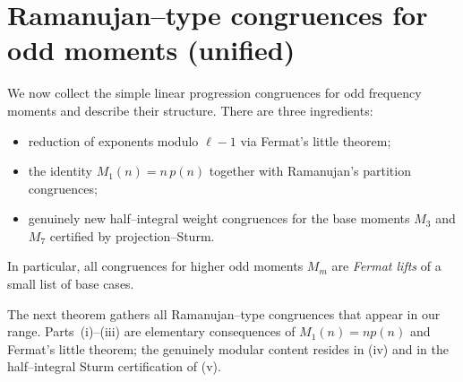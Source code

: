 \documentclass[11pt]{article}
\theoremstyle{definition}
\theoremstyle{remark}
\begin{document}
\section{Ramanujan--type congruences for odd moments (unified)}\label{sec:ram-unified}

We now collect the simple linear progression congruences for odd frequency
moments and describe their structure.  There are three ingredients:
\begin{itemize}
  \item reduction of exponents modulo $\ell-1$ via Fermat's little theorem;
  \item the identity $M_1(n)=n\,p(n)$ together with Ramanujan's partition
  congruences;
  \item genuinely new half--integral weight congruences for the base moments
  $M_3$ and $M_7$ certified by projection--Sturm.
\end{itemize}
In particular, all congruences for higher odd moments $M_m$ are \emph{Fermat
lifts} of a small list of base cases.

The next theorem gathers all Ramanujan--type congruences that appear
in our range. Parts~\textup{(i)}–\textup{(iii)} are elementary
consequences of $M_1(n)=n p(n)$ and Fermat's little theorem; the
genuinely modular content resides in \textup{(iv)} and in the
half--integral Sturm certification of \textup{(v)}.
\end{document}
